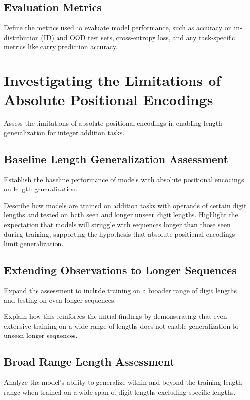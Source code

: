 \subsection{Evaluation Metrics}
Define the metrics used to evaluate model performance, such as accuracy on in-distribution (ID) and OOD test sets, cross-entropy loss, and any task-specific metrics like carry prediction accuracy.

\section{Investigating the Limitations of Absolute Positional Encodings}
\label{sec:absolute_positional_limitations}
Assess the limitations of absolute positional encodings in enabling length generalization for integer addition tasks.

\subsection{Baseline Length Generalization Assessment}
Establish the baseline performance of models with absolute positional encodings on length generalization.

Describe how models are trained on addition tasks with operands of certain digit lengths and tested on both seen and longer unseen digit lengths. Highlight the expectation that models will struggle with sequences longer than those seen during training, supporting the hypothesis that absolute positional encodings limit generalization.

\subsection{Extending Observations to Longer Sequences}
Expand the assessment to include training on a broader range of digit lengths and testing on even longer sequences.

Explain how this reinforces the initial findings by demonstrating that even extensive training on a wide range of lengths does not enable generalization to unseen longer sequences.

\subsection{Broad Range Length Assessment}
Analyze the model's ability to generalize within and beyond the training length range when trained on a wide span of digit lengths excluding specific lengths.

